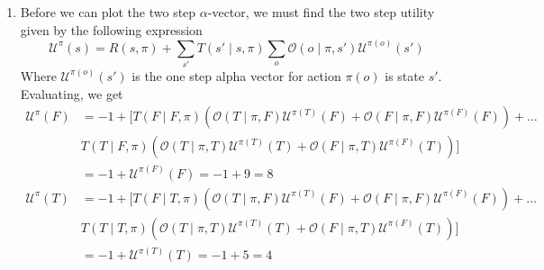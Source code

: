 \documentclass[11pt]{article}
\begin{document}
\begin{enumerate}[label = \alph*)]
\begin{center}
\begin{tikzpicture}[
                every node/.style={align=center},
                main node/.style={draw, circle, minimum size=1.5cm},
                edge/.style={-}
            ]
            \end{tikzpicture}
        \end{center}
    \item 
        
        Before we can plot the two step $\alpha$-vector, we must find the two step utility given by the following expression
        \[\mathcal{U}^\pi(s) = R(s,\pi) + \sum_{s'}T(s' \mid s, \pi) \sum_o \mathcal{O}(o \mid \pi, s') \mathcal{U}^{\pi(o)}(s')\]
        Where $\mathcal{U}^{\pi(o)}(s')$ is the one step alpha vector for action $\pi(o)$ is state $s'$.
        Evaluating, we get 
        \begin{align*}
            \mathcal{U}^\pi(F) &= -1 + [T(F \mid F, \pi) (\mathcal{O}(T \mid \pi, F) \mathcal{U}^{\pi(T)}(F) + \mathcal{O}(F \mid \pi, F) \mathcal{U}^{\pi(F)}(F)) + \dots \\
            &T(T \mid F, \pi) (\mathcal{O}(T \mid \pi, T) \mathcal{U}^{\pi(T)}(T) + \mathcal{O}(F \mid \pi, T) \mathcal{U}^{\pi(F)}(T))] \\
            &= -1 + \mathcal{U}^{\pi(F)}(F) = -1 + 9 = 8 \\
            \mathcal{U}^\pi(T) &= -1 + [T(F \mid T, \pi) (\mathcal{O}(T \mid \pi, F) \mathcal{U}^{\pi(T)}(F) + \mathcal{O}(F \mid \pi, F) \mathcal{U}^{\pi(F)}(F)) + \dots \\
            &T(T \mid T, \pi) (\mathcal{O}(T \mid \pi, T) \mathcal{U}^{\pi(T)}(T) + \mathcal{O}(F \mid \pi, T) \mathcal{U}^{\pi(F)}(T))] \\
            &= -1 + \mathcal{U}^{\pi(T)}(T) = -1 + 5 = 4
        \end{align*}


\end{enumerate}
\end{document}

